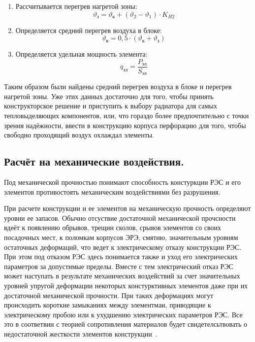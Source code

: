 \begin{enumerate}
\item Рассчитывается перегрев нагретой зоны:
%
\begin{equation}
  \vartheta_з = \vartheta_к + (\vartheta_2 - \vartheta_1) \cdot K_{H2}
\end{equation}

\item Определяется средний перегрев воздуха в блоке:
%
\begin{equation}
  \vartheta_в = 0,5 \cdot (\vartheta_к + \vartheta_з)
\end{equation}

\item Определяется удельная мощность элемента:
  \begin{equation}
    q_{эл} = \frac{P_{эл}}{S_{эл}}
  \end{equation}

\end{enumerate}

Таким образом были найдены средний перегрев воздуха в блоке и перегрев
нагретой зоны. Уже этих данных достаточно для того, чтобы принять
конструкторское решение и приступить к выбору радиатора для самых
тепловыделяющих компонентов, или, что гораздо более предпочтительно с
точки зрения надёжности, ввести в конструкцию корпуса перфорацию для
того, чтобы свободно проходящий воздух охлаждал элементы.

\subsection{Расчёт на механические воздействия. }


Под механической прочностью понимают способность констуркции РЭС и его
элементов противостоять механическим воздействиями без разрушения.

При расчете конструкции и ее элементов на механическую прочность
определяют уровни ее запасов.  Обычно отсуствие достаточной
механической прочсности вдеёт к появлению обрывов, трещин сколов,
срывов элементов со своих посадочных мест, к поломкам корпусов ЭРЭ,
смятию, значительным уровням остаточных деформаций, что ведет к
электрическому отказу конструкции РЭС.
При этом под отказом РЭС здесь понимается также и уход его
электрических параметров за допустимые пределы. Вместе с тем
электрический отказ РЭС может наступать в результате механических
воздействий за счет значительных уровней упругой деформации некоторых
констурктивных элементов даже при их достаточной механической
прочности. При таких деформациях могут происходить короткие замыканиях
между элементмаи, приводящие к электрическому пробою или к ухудшению
электрических параметров РЭС. Все это в соответвии с теорией
сопротивления материалов будет свидетелсьтвовать о недостаточной
жесткости элементов конструкции~\cite{Kalenkovich1989}.

